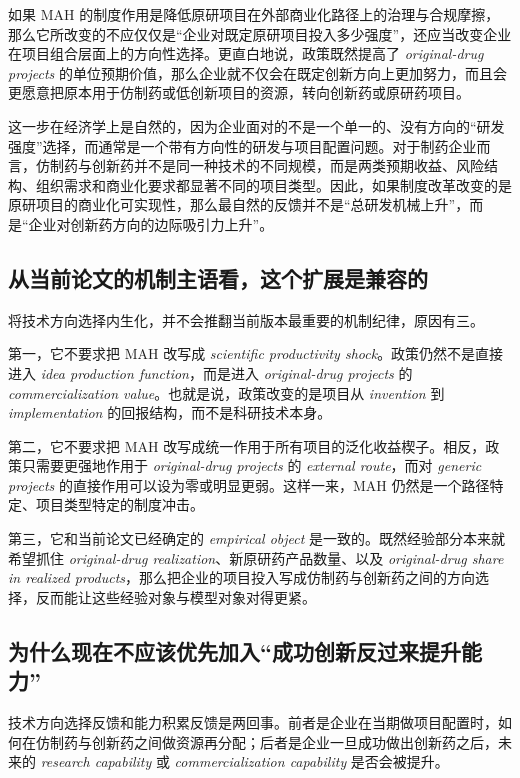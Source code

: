 \documentclass[12pt]{ctexart}
\begin{document}
如果 MAH 的制度作用是降低原研项目在外部商业化路径上的治理与合规摩擦，那么它所改变的不应仅仅是“企业对既定原研项目投入多少强度”，还应当改变企业在项目组合层面上的方向性选择。更直白地说，政策既然提高了 \textit{original-drug projects} 的单位预期价值，那么企业就不仅会在既定创新方向上更加努力，而且会更愿意把原本用于仿制药或低创新项目的资源，转向创新药或原研药项目。

这一步在经济学上是自然的，因为企业面对的不是一个单一的、没有方向的“研发强度”选择，而通常是一个带有方向性的研发与项目配置问题。对于制药企业而言，仿制药与创新药并不是同一种技术的不同规模，而是两类预期收益、风险结构、组织需求和商业化要求都显著不同的项目类型。因此，如果制度改革改变的是原研项目的商业化可实现性，那么最自然的反馈并不是“总研发机械上升”，而是“企业对创新药方向的边际吸引力上升”。

\subsection{从当前论文的机制主语看，这个扩展是兼容的}

将技术方向选择内生化，并不会推翻当前版本最重要的机制纪律，原因有三。

第一，它不要求把 MAH 改写成 \textit{scientific productivity shock}。政策仍然不是直接进入 \textit{idea production function}，而是进入 \textit{original-drug projects} 的 \textit{commercialization value}。也就是说，政策改变的是项目从 \textit{invention} 到 \textit{implementation} 的回报结构，而不是科研技术本身。

第二，它不要求把 MAH 改写成统一作用于所有项目的泛化收益楔子。相反，政策只需要更强地作用于 \textit{original-drug projects} 的 \textit{external route}，而对 \textit{generic projects} 的直接作用可以设为零或明显更弱。这样一来，MAH 仍然是一个路径特定、项目类型特定的制度冲击。

第三，它和当前论文已经确定的 \textit{empirical object} 是一致的。既然经验部分本来就希望抓住 \textit{original-drug realization}、新原研药产品数量、以及 \textit{original-drug share in realized products}，那么把企业的项目投入写成仿制药与创新药之间的方向选择，反而能让这些经验对象与模型对象对得更紧。

\subsection{为什么现在不应该优先加入“成功创新反过来提升能力”}

技术方向选择反馈和能力积累反馈是两回事。前者是企业在当期做项目配置时，如何在仿制药与创新药之间做资源再分配；后者是企业一旦成功做出创新药之后，未来的 \textit{research capability} 或 \textit{commercialization capability} 是否会被提升。
\end{document}
